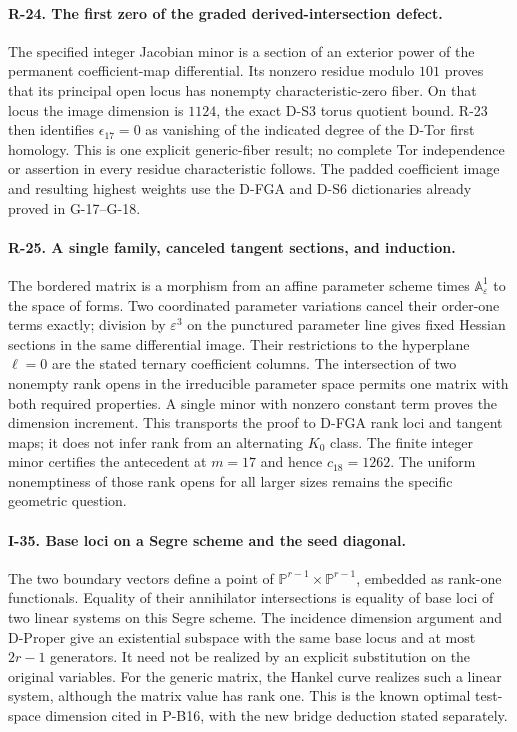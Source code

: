 \paragraph{R-24. The first zero of the graded derived-intersection defect.}
The specified integer Jacobian minor is a section of an exterior
power of the permanent coefficient-map differential. Its nonzero
residue modulo $101$ proves that its principal open locus has
nonempty characteristic-zero fiber. On that locus the image
dimension is $1124$, the exact D-S3 torus quotient bound.
R-23 then identifies $\epsilon_{17}=0$ as vanishing of the
indicated degree of the D-Tor first homology. This is one
explicit generic-fiber result; no complete Tor independence
or assertion in every residue characteristic follows. The
padded coefficient image and resulting highest weights use
the D-FGA and D-S6 dictionaries already proved in G-17--G-18.

\paragraph{R-25. A single family, canceled tangent sections, and induction.}
The bordered matrix is a morphism from an affine parameter scheme
times $\mathbb A^1_\varepsilon$ to the space of forms. Two
coordinated parameter variations cancel their order-one terms
exactly; division by $\varepsilon^3$ on the punctured parameter
line gives fixed Hessian sections in the same differential image.
Their restrictions to the hyperplane $\ell=0$ are the stated
ternary coefficient columns. The intersection of two nonempty
rank opens in the irreducible parameter space permits one matrix
with both required properties. A single minor with nonzero
constant term proves the dimension increment. This transports
the proof to D-FGA rank loci and tangent maps; it does not infer
rank from an alternating $K_0$ class. The finite integer minor
certifies the antecedent at $m=17$ and hence $c_{18}=1262$.
The uniform nonemptiness of those rank opens for all larger
sizes remains the specific geometric question.

\paragraph{I-35. Base loci on a Segre scheme and the seed diagonal.}
The two boundary vectors define a point of
$\mathbb P^{r-1}\times\mathbb P^{r-1}$, embedded as rank-one
functionals. Equality of their annihilator intersections is
equality of base loci of two linear systems on this Segre
scheme. The incidence dimension argument and D-Proper give
an existential subspace with the same base locus and at most
$2r-1$ generators. It need not be realized by an explicit
substitution on the original variables. For the generic matrix,
the Hankel curve realizes such a linear system, although the
matrix value has rank one. This is the known optimal test-space
dimension cited in P-B16, with the new bridge deduction stated
separately.

